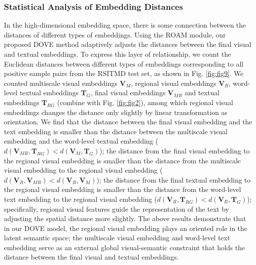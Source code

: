 \documentclass[journal]{IEEEtran}
\begin{document}
\subsubsection{Statistical Analysis of Embedding Distances}
In the high-dimensional embedding space, there is some connection between the distances of different types of embeddings. Using the ROAM module, our proposed DOVE method adaptively adjusts the distances between the final visual and textual embeddings. To express this layer of relationship, we count the Euclidean distances between different types of embeddings corresponding to all positive sample pairs from the RSITMD test set, as shown in Fig. \ref{fig:fig9}. We counted multiscale visual embeddings $\bm{V}_{M}$, regional visual embeddings $\bm{V}_{R}$, word-level textual embeddings $\bm{T}_G$, final visual embeddings $\bm{V}_{M R}$ and textual embeddings $\bm{T}_{R G}$ (combine with Fig. \ref{fig:fig2}), among which regional visual embeddings changes the distance only slightly by linear transformation as orientation. We find that the distance between the final visual embedding and the text embedding is smaller than the distance between the multiscale visual embedding and the word-level textual embedding ($d(\bm{V}_{M R},\bm{T}_{R G}) < d(\bm{V}_{M},\bm{T}_{G})$); the distance from the final visual embedding to the regional visual embedding is smaller than the distance from the multiscale visual embedding to the regional visual embedding ($d(\bm{V}_{R},\bm{V}_{MR}) < d(\bm{V}_{R},\bm{V}_{M})$); the distance from the final textual embedding to the regional visual embedding is smaller than the distance from the word-level text embedding to the regional visual embedding ($d(\bm{V}_{R},\bm{T}_{R G}) < d(\bm{V}_{R},\bm{T}_{G})$); specifically, regional visual features guide the representation of the text by adjusting the spatial distance more slightly. The above results demonstrate that in our DOVE model, the regional visual embedding plays an oriented role in the latent semantic space; the multiscale visual embedding and word-level text embedding serve as an external global visual-semantic constraint that holds the distance between the final visual and textual embeddings.
\end{document}
